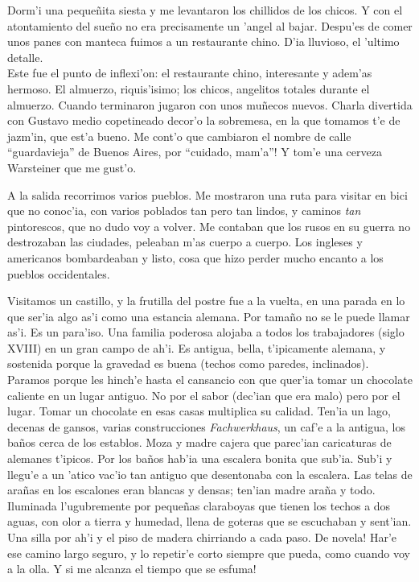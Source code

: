 Dorm'i una peque\~nita siesta y me levantaron los chillidos de los chicos. Y con
el atontamiento del sue\~no no era precisamente un 'angel al bajar. Despu'es de
comer unos panes con manteca fuimos a un restaurante chino. D'ia lluvioso, el
'ultimo detalle.\\

Este fue el punto de inflexi'on: el restaurante chino, interesante y adem'as
hermoso. El almuerzo, riquis'isimo; los chicos, angelitos totales durante el
almuerzo. Cuando terminaron jugaron con unos mu\~necos nuevos. Charla divertida
con Gustavo medio copetineado decor'o la sobremesa, en la que tomamos t'e de
jazm'in, que est'a bueno. \textexclamdown Me cont'o que cambiaron el nombre de
calle ``guardavieja'' de Buenos Aires, por ``cuidado, mam'a''! Y tom'e una
cerveza Warsteiner que me gust'o.

A la salida recorrimos varios pueblos. Me mostraron una ruta para visitar en
bici que no conoc'ia, con varios poblados tan pero tan lindos, y caminos
\emph{tan} pintorescos, que no dudo voy a volver. Me contaban que los rusos en
su guerra no destrozaban las ciudades, peleaban m'as cuerpo a cuerpo. Los
ingleses y americanos bombardeaban y listo, cosa que hizo perder mucho encanto a
los pueblos occidentales.

Visitamos un castillo, y la frutilla del postre fue a la vuelta, en una parada
en lo que ser'ia algo as'i como una estancia alemana. Por tama\~no no se le
puede llamar as'i. Es un para'iso. Una familia poderosa alojaba a todos los
trabajadores (siglo {\small XVIII}) en un gran campo de ah'i. Es antigua, bella,
t'ipicamente alemana, y sostenida porque la gravedad es buena (techos como
paredes, inclinados). Paramos porque les hinch'e hasta el cansancio con que
quer'ia tomar un chocolate caliente en un lugar antiguo. No por el sabor
(dec'ian que era malo) pero por el lugar. Tomar un chocolate en esas casas
multiplica su calidad. Ten'ia un lago, decenas de gansos, varias construcciones
\emph{Fachwerkhaus}, un caf'e a la antigua, los ba\~nos cerca de los establos.
Moza y madre cajera que parec'ian caricaturas de alemanes t'ipicos. Por los
ba\~nos hab'ia una escalera bonita que sub'ia. Sub'i y llegu'e a un 'atico
vac'io tan antiguo que desentonaba con la escalera. Las telas de ara\~nas en los
escalones eran blancas y densas; ten'ian madre ara\~na y todo. Iluminada
l'ugubremente por peque\~nas claraboyas que tienen los techos a dos aguas, con
olor a tierra y humedad, llena de goteras que se escuchaban y sent'ian. Una
silla por ah'i y el piso de madera chirriando a cada paso. \textexclamdown De
novela! Har'e ese camino largo seguro, y lo repetir'e corto siempre que pueda,
como cuando voy a la olla. \textexclamdown Y si me alcanza el tiempo que se
esfuma!

